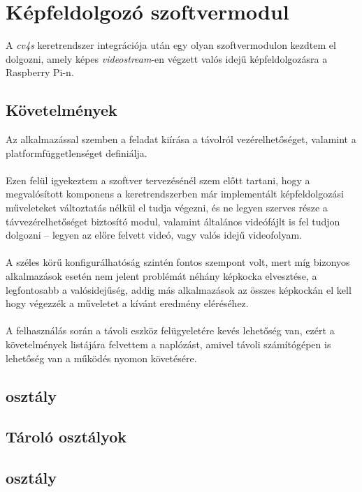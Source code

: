 \chapter{Képfeldolgozó szoftvermodul}

A \emph{cv4s} keretrendszer integrációja után egy olyan szoftvermodulon kezdtem el dolgozni, amely képes \textit{videostream}-en végzett valós idejű képfeldolgozásra a Raspberry Pi-n. 

\section{Követelmények}

Az alkalmazással szemben a feladat kiírása a távolról vezérelhetőséget, valamint a platformfüggetlenséget definiálja. \\
\\
Ezen felül igyekeztem a szoftver tervezésénél szem előtt tartani, hogy a megvalósított komponens a keretrendszerben már implementált képfeldolgozási műveleteket változtatás nélkül el tudja végezni, és ne legyen szerves része a távvezérelhetőséget biztosító modul, valamint általános videófájlt is fel tudjon dolgozni -- legyen az előre felvett videó, vagy valós idejű videofolyam.\\
\\
A széles körű konfigurálhatóság szintén fontos szempont volt, mert míg bizonyos alkalmazások esetén nem jelent problémát néhány képkocka elvesztése, a legfontosabb a valósidejűség, addig más alkalmazások az összes képkockán el kell hogy végezzék a műveletet a kívánt eredmény eléréséhez.\\
\\
A felhasználás során a távoli eszköz felügyeletére kevés lehetőség van, ezért a követelmények listájára felvettem a naplózást, amivel távoli számítógépen is lehetőség van a működés nyomon követésére.

\section{ osztály}

\section{Tároló osztályok}

\section{ osztály}

